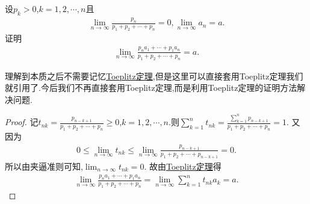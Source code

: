 \documentclass[../../main.tex]{subfiles}%
\begin{document}
\begin{example}
设\(p_k > 0\),\(k = 1,2,\cdots,n\)且
\begin{align*}
\lim_{n \to \infty} \frac{p_n}{p_1 + p_2 + \cdots + p_n} = 0,\lim_{n \to \infty} a_n = a.
\end{align*}
证明
\begin{align*}
\lim_{n \to \infty} \frac{p_n a_1 + \cdots + p_1 a_n}{p_1 + p_2 + \cdots + p_n} = a.   
\end{align*}
\end{example}
\begin{note}
理解到本质之后不需要记忆\hyperref[theorem:Toeplitz定理]{Toeplitz定理},但是这里可以直接套用Toeplitz定理我们就引用了.今后我们不再直接套用Toeplitz定理,而是利用Toeplitz定理的证明方法解决问题.
\end{note}
\begin{proof}
记\(t_{nk} = \frac{p_{n - k + 1}}{p_1 + p_2 + \cdots + p_n} \geqslant  0\),\(k = 1,2,\cdots,n\).则\(\sum\limits_{k = 1}^{n} t_{nk} = \frac{\sum\limits_{k = 1}^{n} p_{n - k + 1}}{p_1 + p_2 + \cdots + p_n} = 1\).
又因为
\begin{align*}
0 \leqslant  \lim_{n \to \infty} t_{nk} \leqslant  \lim_{n \to \infty} \frac{p_{n - k + 1}}{p_1 + p_2 + \cdots + p_{n - k + 1}} = 0.
\end{align*}
所以由夹逼准则可知,$\lim_{n \to \infty} t_{nk}=0$.
故由\hyperref[theorem:Toeplitz定理]{Toeplitz定理}得
\begin{align*}
\lim_{n \to \infty} \frac{p_n a_1 + \cdots + p_1 a_n}{p_1 + p_2 + \cdots + p_n}=\lim_{n \to \infty} \sum\limits_{k = 1}^{n} t_{nk} a_k = a .
\end{align*}
\end{proof}
\end{document}
